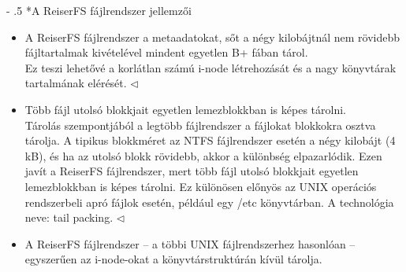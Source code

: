 \documentclass[tikz,12pt,margin=0px]{article}
\makeatletter
\renewcommand\paragraph{%
	\@startsection{paragraph}{4}{0mm}%
	{-\baselineskip}%
	{.5\baselineskip}%
	{\normalfont\normalsize\bfseries}}
\makeatother
\begin{document}
    \paragraph*{A ReiserFS fájlrendszer jellemzői\\}

    \begin{itemize}[topsep=8pt,itemsep=4pt,partopsep=4pt, parsep=4pt]
        \item A ReiserFS fájlrendszer a metaadatokat, sőt a négy kilobájtnál nem rövidebb fájltartalmak kivételével mindent egyetlen B+ fában tárol.\\

        {\footnotesize \noindent {\color{blue} \faLightbulbO\ $\triangleright$ } }
        {\footnotesize
        Ez teszi lehetővé a korlátlan számú i-node létrehozását és a nagy könyvtárak tartalmának elérését.
        $\triangleleft$ \faLightbulbO}\\

        \item Több fájl utolsó blokkjait egyetlen lemezblokkban is képes tárolni.\\

        {\footnotesize \noindent {\color{blue} \faLightbulbO\ $\triangleright$ } }
        {\footnotesize
        \noindent Tárolás szempontjából a legtöbb fájlrendszer a fájlokat blokkokra osztva tárolja. A tipikus blokkméret az NTFS fájlrendszer esetén a négy kilobájt (4 kB), és ha az utolsó blokk rövidebb, akkor a különbség elpazarlódik. Ezen javít a ReiserFS fájlrendszer, mert több fájl utolsó blokkjait egyetlen lemezblokkban is képes tárolni. Ez különösen előnyös az UNIX operációs rendszerbeli apró fájlok esetén, például egy /etc könyvtárban. A technológia neve: tail packing.
        $\triangleleft$ \faLightbulbO}\\

        \item A ReiserFS fájlrendszer – a többi UNIX fájlrendszerhez hasonlóan – egyszerűen az i-node-okat a könyvtárstruktúrán kívül tárolja.\\


\end{itemize}
\end{document}
